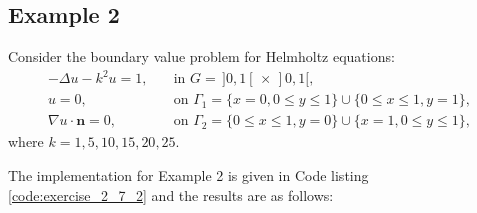 	\subsection{Example 2}
	Consider the boundary value problem for Helmholtz equations:
	\begin{align*}
		-\Delta{u} - k^2 u=1,\quad &\textrm{in } G=\,]0,1[\,\times\,]0,1[,\\
		u=0,\quad &\textrm{on }\Gamma_1=\{x=0,0\leq y\leq 1\}\cup
		\{0\leq x \leq 1, y=1\},\\
		\nabla{u}\cdot\boldsymbol{n}=0,\quad &\textrm{on }\Gamma_2=
		\{0\leq x\leq 1,y=0\}\cup\{x=1,0\leq y \leq 1\},
	\end{align*}
	where $k=1,5,10,15,20,25$.
	
	The implementation for Example 2 is given in Code listing
	\ref{code:exercise_2_7_2} and the results are as follows:	
